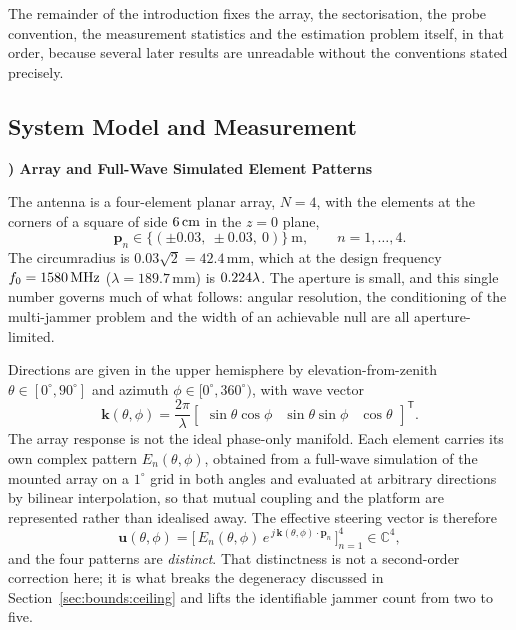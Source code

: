 \documentclass[journal]{IEEEtran}
\newcommand{\uv}{\mathbf{u}}
\newcommand{\Tr}{\mathsf{T}}
\newcommand{\degs}{^\circ}
\newcounter{modelpart}[subsection]
\newcommand{\modelpart}[1]{%
  \par\medskip\refstepcounter{modelpart}%
  \noindent\textbf{\arabic{modelpart}) #1}\par\smallskip\noindent\ignorespaces}
\begin{document}
The remainder of the introduction fixes the array, the sectorisation, the probe
convention, the measurement statistics and the estimation problem itself, in
that order, because several later results are unreadable without the
conventions stated precisely.

\subsection{System Model and Measurement}
\label{sec:model}

\modelpart{Array and Full-Wave Simulated Element Patterns}
\label{sec:model:array}

The antenna is a four-element planar array, $N = 4$, with the elements at the
corners of a square of side $6\,\mathrm{cm}$ in the $z = 0$ plane,
\begin{equation}
\mathbf{p}_n \in \{(\pm 0.03,\ \pm 0.03,\ 0)\}\ \mathrm{m},
\qquad n = 1,\dots,4 .
\label{eq:positions}
\end{equation}
The circumradius is $0.03\sqrt{2} = 42.4\,\mathrm{mm}$, which at the design
frequency $f_0 = 1580\,\mathrm{MHz}$ ($\lambda = 189.7\,\mathrm{mm}$) is
$0.224\lambda$. The aperture is small, and this single number governs much of
what follows: angular resolution, the conditioning of the multi-jammer problem
and the width of an achievable null are all aperture-limited.

Directions are given in the upper hemisphere by elevation-from-zenith
$\theta \in [0\degs, 90\degs]$ and azimuth $\phi \in [0\degs, 360\degs)$, with
wave vector
\begin{equation}
\mathbf{k}(\theta,\phi) = \frac{2\pi}{\lambda}
\begin{bmatrix}
\sin\theta\cos\phi & \sin\theta\sin\phi & \cos\theta
\end{bmatrix}^{\Tr}.
\label{eq:wavevector}
\end{equation}
The array response is not the ideal phase-only manifold. Each element carries
its own complex pattern $E_n(\theta,\phi)$, obtained from a full-wave
simulation of the mounted array on a $1\degs$ grid in both angles and
evaluated at arbitrary directions by bilinear interpolation, so that mutual
coupling and the platform are represented rather than idealised away. The
effective steering vector is therefore
\begin{equation}
\uv(\theta,\phi) = \Big[\,
E_n(\theta,\phi)\, e^{\,j\,\mathbf{k}(\theta,\phi)\cdot\mathbf{p}_n}
\,\Big]_{n=1}^{4} \in \mathbb{C}^{4},
\label{eq:steering}
\end{equation}
and the four patterns are \emph{distinct}. That distinctness is not a
second-order correction here; it is what breaks the degeneracy discussed in
Section~\ref{sec:bounds:ceiling} and lifts the identifiable jammer count from
two to five.
\end{document}
